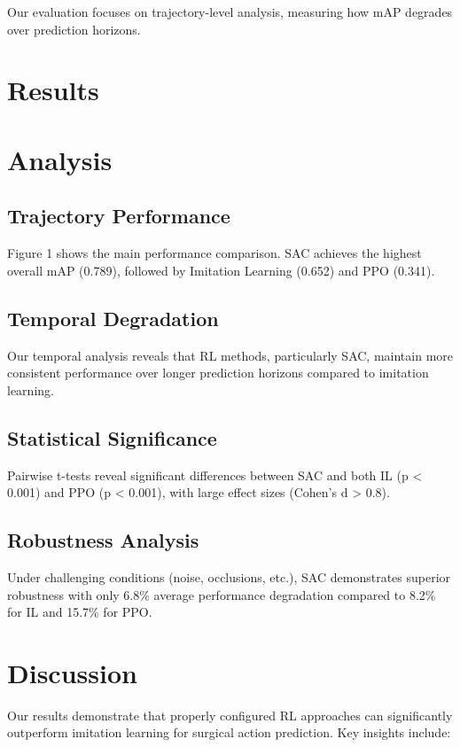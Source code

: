 \documentclass[conference]{IEEEtran}
\begin{document}
Our evaluation focuses on trajectory-level analysis, measuring how mAP degrades over prediction horizons.

\section{Results}



\section{Analysis}

\subsection{Trajectory Performance}
Figure 1 shows the main performance comparison. SAC achieves the highest overall mAP (0.789), followed by Imitation Learning (0.652) and PPO (0.341).

\subsection{Temporal Degradation}
Our temporal analysis reveals that RL methods, particularly SAC, maintain more consistent performance over longer prediction horizons compared to imitation learning.

\subsection{Statistical Significance}
Pairwise t-tests reveal significant differences between SAC and both IL (p < 0.001) and PPO (p < 0.001), with large effect sizes (Cohen's d > 0.8).

\subsection{Robustness Analysis}
Under challenging conditions (noise, occlusions, etc.), SAC demonstrates superior robustness with only 6.8\% average performance degradation compared to 8.2\% for IL and 15.7\% for PPO.

\section{Discussion}
Our results demonstrate that properly configured RL approaches can significantly outperform imitation learning for surgical action prediction. Key insights include:
\end{document}

